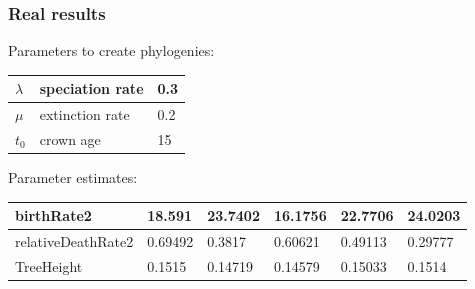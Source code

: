 \documentclass{beamer}
\begin{document}
\begin{frame}
  \frametitle{Real results}

  Parameters to create phylogenies:

  \begin{table}
    \centering
    \begin{tabular}{ | l | l | l | }
      \hline
      $\lambda$ & speciation rate & 0.3 \\
      \hline
      $\mu$ & extinction rate & 0.2 \\
      \hline
      $t_0$ & crown age & 15 \\
      \hline
    \end{tabular}
  \end{table}

  Parameter estimates:

  \begin{table}
    \begin{tabular}{ | l | l | l | l | l | l | }
      \hline
      birthRate2         & 18.591  & 23.7402 & 16.1756 & 22.7706 & 24.0203 \\
      \hline
      relativeDeathRate2 & 0.69492 & 0.3817  & 0.60621 & 0.49113 & 0.29777 \\
      \hline
      TreeHeight         & 0.1515  & 0.14719 & 0.14579 & 0.15033 & 0.1514  \\
      \hline
    \end{tabular}
  \end{table}

\end{frame}
\end{document}
